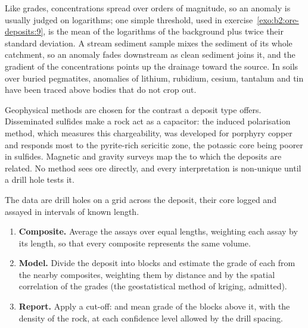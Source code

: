 Like grades, concentrations spread over orders of magnitude, so an anomaly is usually judged on
logarithms; one simple threshold, used in exercise~\ref{exo:b2:ore-deposits:9}, is the mean of
the logarithms of the background plus twice their standard deviation. A stream sediment sample
mixes the sediment of its whole catchment, so an anomaly fades downstream as clean sediment joins
it, and the gradient of the concentrations points up the drainage toward the source. In soils over
buried pegmatites, anomalies of lithium, rubidium, cesium, tantalum and tin have been traced above
bodies that do not crop out.

Geophysical methods are chosen for the contrast a deposit type offers. Disseminated sulfides make a
rock act as a capacitor: the induced polarisation method, which measures this chargeability, was
developed for porphyry copper and responds most to the pyrite-rich sericitic zone, the potassic
core being poorer in sulfides. Magnetic and gravity surveys map the  to which the deposits
are related. No method sees ore
directly, and every interpretation is non-unique until a drill hole tests it.

\begin{method}\label{met:b2:ore-deposits:resource}
The data are drill holes on a grid across the deposit, their core logged and assayed in intervals
of known length.
\begin{enumerate}
  \item \textbf{Composite.} Average the assays over equal lengths, weighting each assay by its
        length, so that every composite represents the same volume.
  \item \textbf{Model.} Divide the deposit into blocks and estimate the grade of each from the
        nearby composites, weighting them by distance and by the spatial correlation of the grades
        (the geostatistical method of kriging, admitted).
  \item \textbf{Report.} Apply a cut-off:  and mean grade of the blocks above it, with the
        density of the rock, at each confidence level allowed by the drill spacing.
\end{enumerate}
\end{method}

